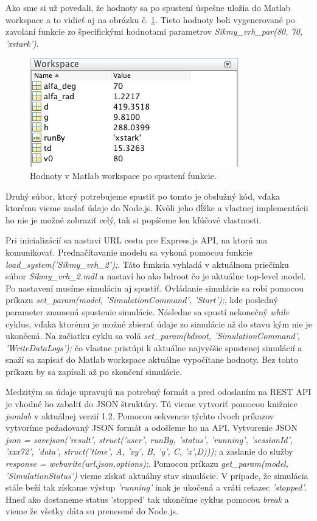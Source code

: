 Ako sme si už povedali, že hodnoty sa po spustení úspešne uložia do Matlab workspace a to vidieť aj na obrázku č. \ref{matlab-function-workspace}. Tieto hodnoty boli vygenerované po zavolaní funkcie zo špecifickými hodnotami parametrov \textit{Sikmy\_vrh\_par(80, 70, 'xstark')}.

\begin{figure}[H]
  \centering
  \includegraphics[scale=0.7]{img/code/matlab-function-workspace.png}
  \caption{Hodnoty v Matlab workspace po spustení funkcie.}
  \label{matlab-function-workspace}
\end{figure}

Druhý súbor, ktorý potrebujeme spustiť po tomto je obslužný kód, vďaka ktorému vieme zaslať údaje do Node.js. Kvôli jeho dĺžke a vlastnej implementácii ho nie je možné zobraziť celý, tak si popíšeme len kľúčové vlastnosti.

Pri inicializácií sa nastavi URL cesta pre Express.js API, na ktorú ma komunikovať. Prednačítavanie modelu sa vykoná pomocou funkcie \textit{load\_system('Sikmy\_vrh\_2');}. Táto funkcia vyhladá v aktuálnom priečinku súbor \textit{Sikmy\_vrh\_2.mdl} a nastaví ho ako bdroot čo je aktuálne top-level model. Po nastavení musíme simuláciu aj spustiť. Ovládanie simulácie sa robí pomocou príkazu \textit{set\_param(model, 'SimulationCommand', 'Start');}, kde posledný parameter znamená spustenie simulácie.
Následne sa spustí nekonečný \textit{while} cyklus, vďaka ktorému je možné zbierať údaje zo simulácie až do stavu kým nie je ukončená. 
Na začiatku cyklu sa volá \textit{set\_param(bdroot, 'SimulationCommand', 'WriteDataLogs');} čo vlastne pristúpi k aktuálne najvyššie spustenej simulácií a snaží sa zapísať do Matlab workspace aktuálne vypočítane hodnoty. Bez tohto príkazu by sa zapísali až po skončení simulácie.

Medzitým sa údaje upravujú na potrebný formát a pred odoslaním na REST API je vhodné ho zabaliť do JSON štruktúry. Tú vieme vytvoriť pomocou knižnice \textit{jsonlab} v aktuálnej verzií 1.2.
Pomocou sekvencie týchto dvoch príkazov vytvoríme požadovaný JSON formát a odošleme ho na API. Vytvorenie JSON \textit{json = savejson('result', struct('user', runBy, 'status', 'running', 'sessionId', 'xxx72', 'data', struct('time', A, 'vy', B, 'y', C, 'x',D)));} a zaslanie do služby \textit{response = webwrite(url,json,options);}. Pomocou príkazu \textit{get\_param(model, 'SimulationStatus')} vieme získať aktuálny stav simulácie. V prípade, že simulácia stále beží tak získame výstup \textit{'running'} inak je ukočená a vráti reťazec \textit{'stopped'}. Hneď ako dostaneme status 'stopped' tak ukončíme cyklus pomocou \textit{break} a vieme že všetky dáta su prenesené do Node.js.

